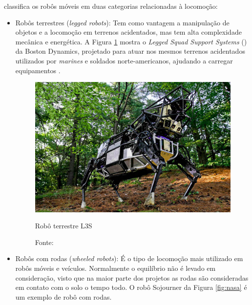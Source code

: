 classifica os robôs móveis em duas categorias relacionadas à locomoção: 
\begin{itemize}
 
 \item Robôs terrestres (\textit{legged robots}): Tem como vantagem a manipulação de objetos e a locomoção em terrenos 
acidentados, mas tem alta complexidade mecânica e energética. A Figura \ref{fig:boston} mostra o 
\textit{Legged Squad Support Systems} () da Boston Dynamics, 
projetado para atuar nos mesmos terrenos acidentados utilizados por \textit{marines} e soldados norte-americanos, 
ajudando a carregar equipamentos \cite{bostondyn}. 
\begin{figure}[h]
 \centering
 \captionsetup{width=0.44\textwidth,font=footnotesize,textfont=bf}
 \includegraphics[scale=0.4]{figuras/bostondyn.png}
 \caption{Robô terrestre  L3S\label{fig:boston}}
 \vspace{-0.3cm}
 \caption*{Fonte: \cite{bostondyn}}
\end{figure}


\item Robôs com rodas (\textit{wheeled robots}): É o tipo de locomoção mais utilizado em robôs móveis e veículos. Normalmente o 
equilíbrio não é levado em consideração, visto que na maior parte dos projetos as rodas são consideradas em contato com o solo 
o tempo todo. O robô Sojourner da Figura \ref{fig:nasa} é um exemplo de robô com rodas.%
\end{itemize}


